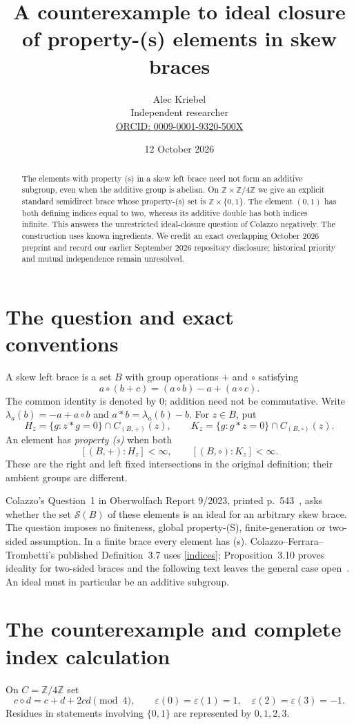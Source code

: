 \documentclass[11pt]{article}
\title{A counterexample to ideal closure of property-(s) elements in skew braces}
\author{Alec Kriebel\\
\small Independent researcher\\
\small \href{https://orcid.org/0009-0001-9320-500X}{ORCID: 0009-0001-9320-500X}}
\date{12 October 2026}
\newcommand{\Z}{\mathbb Z}
\newcommand{\Sset}{\mathcal S}
\begin{document}
\maketitle
\begin{abstract}
The elements with property (s) in a skew left brace need not form an
additive subgroup, even when the additive group is abelian.
On $\Z\times\Z/4\Z$ we give an explicit standard semidirect brace whose
property-(s) set is $\Z\times\{0,1\}$. The element $(0,1)$ has both
defining indices equal to two, whereas its additive double has both
indices infinite. This answers the unrestricted ideal-closure question
of Colazzo negatively. The construction uses known ingredients.
We credit an exact overlapping October 2026 preprint and record our
earlier September 2026 repository disclosure; historical priority and
mutual independence remain unresolved.
\end{abstract}

\section{The question and exact conventions}
A skew left brace is a set $B$ with group operations $+$ and $\circ$
satisfying
\[
 a\circ(b+c)=(a\circ b)-a+(a\circ c).
\]
The common identity is denoted by $0$; addition need not be commutative.
Write $\lambda_a(b)=-a+a\circ b$ and $a*b=\lambda_a(b)-b$.
For $z\in B$, put
\[
 H_z=\{g:z*g=0\}\cap C_{(B,+)}(z),\qquad
 K_z=\{g:g*z=0\}\cap C_{(B,\circ)}(z).
\]
An element has \emph{property (s)} when both
\begin{equation}\label{indices}
 [(B,+):H_z]<\infty,\qquad [(B,\circ):K_z]<\infty .
\end{equation}
These are the right and left fixed intersections in the original
definition; their ambient groups are different.

Colazzo's Question~1 in Oberwolfach Report 9/2023, printed
p.~543~\cite{OWR}, asks whether the set $\Sset(B)$ of these elements is
an ideal for an arbitrary skew brace.
The question imposes no finiteness, global property-(S), finite-generation
or two-sided assumption. In a finite brace every element has (s).
Colazzo--Ferrara--Trombetti's published Definition~3.7 uses
\eqref{indices}; Proposition~3.10 proves ideality for two-sided braces
and the following text leaves the general case open~\cite{CFT}.
An ideal must in particular be an additive subgroup.

\section{The counterexample and complete index calculation}
On $C=\Z/4\Z$ set
\[
 c\diamond d=c+d+2cd\pmod4,\qquad
 \varepsilon(0)=\varepsilon(1)=1,\quad
 \varepsilon(2)=\varepsilon(3)=-1.
\]
Residues in statements involving $\{0,1\}$ are represented by
$0,1,2,3$.
\end{document}
